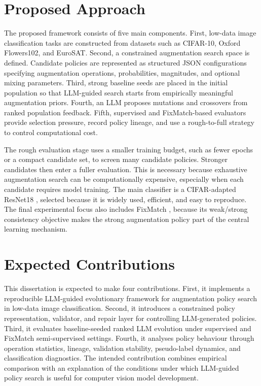 \documentclass[12pt,a4paper]{report}
\begin{document}
\section{Proposed Approach}

The proposed framework consists of five main components. First, low-data image classification tasks are constructed from datasets such as CIFAR-10, Oxford Flowers102, and EuroSAT. Second, a constrained augmentation search space is defined. Candidate policies are represented as structured JSON configurations specifying augmentation operations, probabilities, magnitudes, and optional mixing parameters. Third, strong baseline seeds are placed in the initial population so that LLM-guided search starts from empirically meaningful augmentation priors. Fourth, an LLM proposes mutations and crossovers from ranked population feedback. Fifth, supervised and FixMatch-based evaluators provide selection pressure, record policy lineage, and use a rough-to-full strategy to control computational cost.

The rough evaluation stage uses a smaller training budget, such as fewer epochs or a compact candidate set, to screen many candidate policies. Stronger candidates then enter a fuller evaluation. This is necessary because exhaustive augmentation search can be computationally expensive, especially when each candidate requires model training. The main classifier is a CIFAR-adapted ResNet18 \citep{he2016deep}, selected because it is widely used, efficient, and easy to reproduce. The final experimental focus also includes FixMatch \citep{sohn2020fixmatch}, because its weak/strong consistency objective makes the strong augmentation policy part of the central learning mechanism.

\section{Expected Contributions}

This dissertation is expected to make four contributions. First, it implements a reproducible LLM-guided evolutionary framework for augmentation policy search in low-data image classification. Second, it introduces a constrained policy representation, validator, and repair layer for controlling LLM-generated policies. Third, it evaluates baseline-seeded ranked LLM evolution under supervised and FixMatch semi-supervised settings. Fourth, it analyses policy behaviour through operation statistics, lineage, validation stability, pseudo-label dynamics, and classification diagnostics. The intended contribution combines empirical comparison with an explanation of the conditions under which LLM-guided policy search is useful for computer vision model development.
\end{document}
